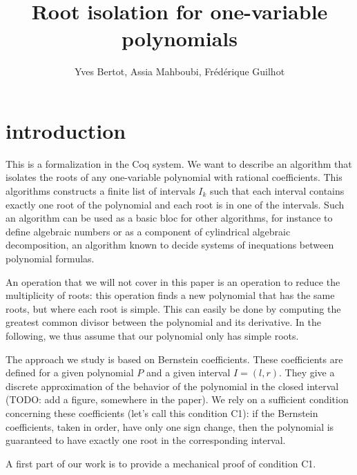 \documentclass{mscs}
\begin{document}
\title{Root isolation for one-variable polynomials}
\author{Yves Bertot, Assia Mahboubi, Fr\'ed\'erique Guilhot}

\maketitle

\section{introduction}
This is a formalization in the Coq system\cite{coqart}.
We want to describe an algorithm that isolates the roots of any
one-variable polynomial with rational coefficients.  This algorithms
constructs a finite list of intervals \(I_k\) such that each interval
contains exactly one root of the polynomial and each root is in one of
the intervals.  Such an algorithm can be used as a basic bloc for
other algorithms, for instance to define algebraic numbers or as a
component of cylindrical algebraic decomposition, an algorithm known
to decide systems of inequations between polynomial formulas.

An operation that we will not cover in this paper is an operation
 to reduce the multiplicity of roots: this operation finds a new
polynomial that has the same roots, but where each root is simple.
This can easily be done by computing the greatest
common divisor between the polynomial and its derivative.  In the
following, we thus assume that our polynomial only has simple roots.

The approach we study is based on Bernstein coefficients.  These
coefficients are defined for a given polynomial \(P\) and a given
interval \(I=(l,r)\).  They give a discrete approximation of the behavior of
the polynomial in the closed interval ({\sf TODO: add a figure, somewhere
in the paper}).  We rely on a sufficient
condition concerning these coefficients (let's call this condition
C1): if the Bernstein coefficients, taken in order, have only one
sign change, then the polynomial is guaranteed to have exactly one
root in the corresponding interval.

A first part of our work is to provide a mechanical proof of condition C1.
\end{document}
